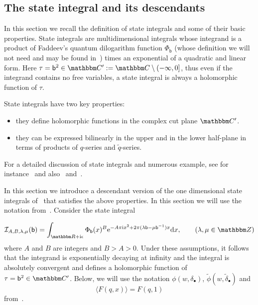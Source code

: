 \documentclass[12pt,reqno]{amsart}
\theoremstyle{definition}
\def\BZ{\mathbbm Z}
\def\BR{\mathbbm R}
\def\BC{\mathbbm C}
\def\calI{\mathcal I}
\def\calI{\mathcal I}
\def\tq{\tilde{q}}
\def\bb{\mathsf{b}}
\def\ri{\mathrm{i}}
\def\rd{\mathrm{d}}
\def\vev#1{\langle #1 \rangle}
\def\re{{\rm e}}
\def\ri{{\rm i}}
\def\rd{{\rm d}}
\begin{document}
\subsection{The state integral and its descendants}
\label{sub.state}

In this section we recall the definition of state integrals and some
of their basic properties. State integrals are multidimensional
integrals whose integrand is a product of Faddeev's quantum
dilogarithm function $\Phi_{\bb}$ (whose definition we will not need
and may be found in~\cite{Faddeev,FK-QDL}) times an exponential of a
quadratic and linear form. Here
$\tau=\bb^2 \in \BC':=\BC\setminus(-\infty,0]$, thus even if the
integrand contains no free variables, a state integral is always a
holomorphic function of $\tau$.

State integrals have two key properties:
\begin{itemize}
\item[(a)] they define holomorphic functions in the complex cut plane
  $\BC'$.
\item[(b)] they can be expressed bilinearly in the upper and in the
  lower half-plane in terms of products of $q$-series and
  $\tq$-series.
\end{itemize}
For a detailed discussion of state integrals and numerous example, see
for instance~\cite{Beem} and also~\cite{AK} and~\cite{GK:qseries}.

In this section we introduce a descendant version of the one
dimensional state integrals of~\cite{GK:qseries} that satisfies the
above properties. In this section we will use the notation
from~\cite{GK:qseries}.  Consider the state integral

\begin{equation}
\label{eq.statelm}
  \calI_{A,B,\lambda,\mu}(\bb) =
    \int_{\BR+\ri\epsilon} \Phi_{\bb}(x)^B \re^{-A\pi\ri x^2 +
      2\pi(\lambda \bb - \mu \bb^{-1})x}\rd x,\qquad
     (\lambda,\mu\in \BZ)
   \end{equation}
   where $A$ and $B$ are integers and $B > A > 0$. Under these
  assumptions, it follows that the integrand is exponentially decaying
  at infinity and the integral is absolutely convergent and defines
  a holomorphic
  function of $\tau = \bb^2 \in \BC'$.
  Below, we will use the notation
  $\phi(w,\delta_\bullet)$, $\tilde{\phi}(w,\tilde{\delta}_\bullet)$
  and 
  \begin{equation}
    \vev{F(q,x)} = F(q,1)
  \end{equation}
  from~\cite{GK:qseries}.
  
\end{document}
